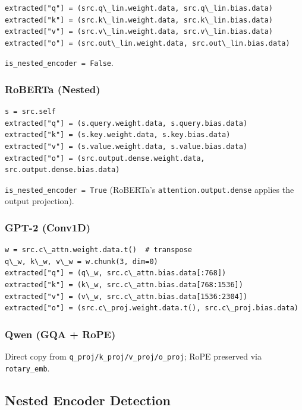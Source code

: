 \begin{lstlisting}
extracted["q"] = (src.q\_lin.weight.data, src.q\_lin.bias.data)
extracted["k"] = (src.k\_lin.weight.data, src.k\_lin.bias.data)
extracted["v"] = (src.v\_lin.weight.data, src.v\_lin.bias.data)
extracted["o"] = (src.out\_lin.weight.data, src.out\_lin.bias.data)
\end{lstlisting}

\texttt{is\_nested\_encoder = False}.

\subsubsection{RoBERTa (Nested)}

\begin{lstlisting}
s = src.self
extracted["q"] = (s.query.weight.data, s.query.bias.data)
extracted["k"] = (s.key.weight.data, s.key.bias.data)
extracted["v"] = (s.value.weight.data, s.value.bias.data)
extracted["o"] = (src.output.dense.weight.data, src.output.dense.bias.data)
\end{lstlisting}

\texttt{is\_nested\_encoder = True} (RoBERTa's \texttt{attention.output.dense} applies the 
output projection).

\subsubsection{GPT-2 (Conv1D)}

\begin{lstlisting}
w = src.c\_attn.weight.data.t()  # transpose
q\_w, k\_w, v\_w = w.chunk(3, dim=0)
extracted["q"] = (q\_w, src.c\_attn.bias.data[:768])
extracted["k"] = (k\_w, src.c\_attn.bias.data[768:1536])
extracted["v"] = (v\_w, src.c\_attn.bias.data[1536:2304])
extracted["o"] = (src.c\_proj.weight.data.t(), src.c\_proj.bias.data)
\end{lstlisting}

\subsubsection{Qwen (GQA + RoPE)}

Direct copy from \texttt{q\_proj/k\_proj/v\_proj/o\_proj}; RoPE preserved via 
\texttt{rotary\_emb}.

\subsection{Nested Encoder Detection}

